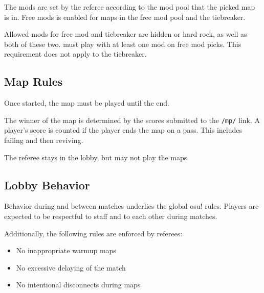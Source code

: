 The mods are set by the referee according to the mod pool that the picked map is in. Free mods is enabled for maps in the free mod pool and the tiebreaker.

Allowed mods for free mod and tiebreaker are hidden or hard rock, as well as both of these two.
 must play with at least one mod on free mod picks. This requirement does not apply to the tiebreaker.


\subsection{Map Rules}

Once started, the map must be played until the end.

The winner of the map is determined by the scores submitted to the \texttt{/mp/} link. A player's score is counted if the player ends the map on a pass. This includes failing and then reviving.


The referee stays in the lobby, but may not play the maps.

\subsection{Lobby Behavior}

Behavior during and between matches underlies the global osu! rules. Players are expected to be respectful to staff and to each other during matches.

\begin{samepage}
Additionally, the following rules are enforced by referees:

\begin{itemize}
	\item No inappropriate warmup maps
	\item No excessive delaying of the match
	\item No intentional disconnects during maps
\end{itemize}
\end{samepage}

